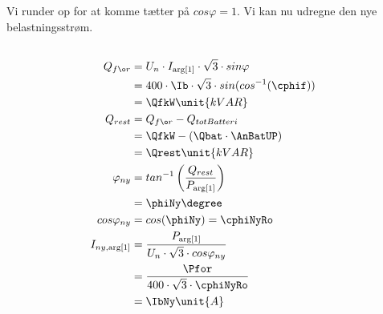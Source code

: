 {Vi runder op for at komme tætter på $cos \varphi = 1$. Vi kan nu udregne den nye belastningsstrøm.
%
\begin{align*}\\
Q_{før} &= U_{n} \cdot I_{\arg[1]} \cdot \sqrt{3} \cdot sin \varphi\\
		&= 400 \cdot \Ib \cdot \sqrt{3} \cdot sin(cos^{-1}(\cphif))\\
		&= \QfkW \unit{kVAR}\\
Q_{rest} &= Q_{før} - Q_{totBatteri}\\
		&= \QfkW - (\Qbat \cdot \AnBatUP)\\
		&= \Qrest \unit{kVAR}\\
\varphi_{ny}		&= tan^{-1}\left(\frac{Q_{rest}}{P_{\arg[1]}}\right)\\
					&= \phiNy \degree\\
cos \varphi_{ny} &= cos(\phiNy) = \cphiNyRo\\
I_{ny,\arg[1]} &= \frac{P_{\arg[1]}}{U_{n} \cdot \sqrt{3} \cdot cos \varphi_{ny}}\\
			&= \frac{\Pfor}{400 \cdot \sqrt{3} \cdot \cphiNyRo}\\
			&= \IbNy \unit{A}
\end{align*}
}


